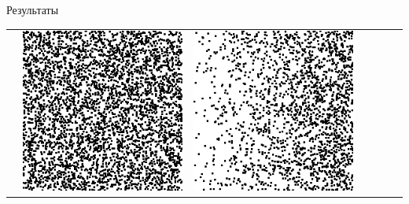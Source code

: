 \documentclass[12pt]{beamer}
\begin{document}
\begin{frame}{Результаты}
\begin{table}
\begin{center}
\begin{tabular}{p{1.2cm} p{1.2cm} p{1.2cm} p{1.2cm} p{1.2cm} p{1.2cm} p{1.2cm}}
					&
					\includegraphics[width=1\linewidth]{8-results/sand-trend8/right2}
					&
					\includegraphics[width=1\linewidth]{8-results/sand-trend8/pan2}
					&

\end{tabular}
\end{center}
\end{table}
\end{frame}
\end{document}
